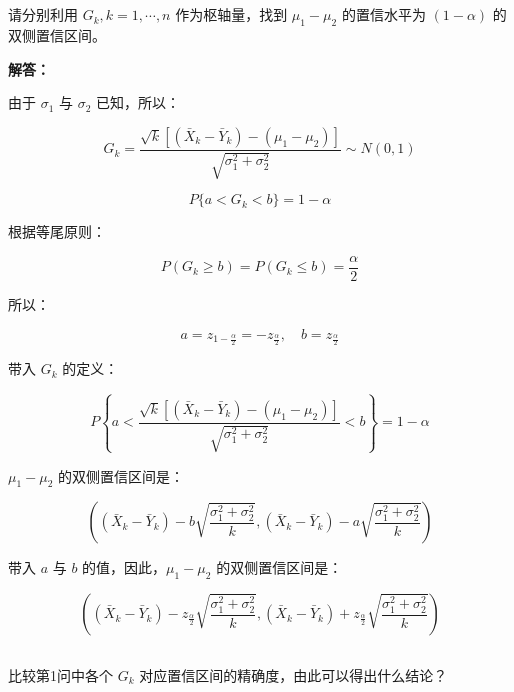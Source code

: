 \documentclass[12pt,a4paper]{article}
\begin{document}
\subsection{}

请分别利用 $G_k, k=1,\cdots,n$ 作为枢轴量，找到 $\mu_1-\mu_2$ 的置信水平为 $(1-\alpha)$ 的双侧置信区间。

\begin{answerbox}
\textbf{解答：}
  
由于 $\sigma_1$ 与 $\sigma_2$ 已知，所以：

$$
G_k = \frac{\sqrt{k}\left[(\bar{X}_k-\bar{Y}_k)-(\mu_1-\mu_2)\right]}{\sqrt{\sigma_1^2+\sigma_2^2}} \sim N(0,1)
$$

$$
P\{a < G_k < b\} = 1 - \alpha
$$

根据等尾原则：

$$
P\left(G_k \geq b\right) = P\left(G_k \leq b\right) = \frac{\alpha}{2}
$$

所以：

$$
a = z_{1-\frac{\alpha}{2}} = -z_{\frac{\alpha}{2}}, \quad b = z_{\frac{\alpha}{2}}
$$

带入 $G_k$ 的定义：

$$
P\left\{a < \frac{\sqrt{k}\left[(\bar{X}_k-\bar{Y}_k)-(\mu_1-\mu_2)\right]}{\sqrt{\sigma_1^2+\sigma_2^2}} < b\right\}  = 1-\alpha
$$

$\mu_1-\mu_2$ 的双侧置信区间是：

$$
\left((\bar{X}_k-\bar{Y}_k)-b\sqrt{\frac{\sigma_1^2+\sigma_2^2}{k}}, (\bar{X}_k-\bar{Y}_k)-a\sqrt{\frac{\sigma_1^2+\sigma_2^2}{k}}\right)
$$

带入 $a$ 与 $b$ 的值，因此，$\mu_1-\mu_2$ 的双侧置信区间是：

$$
\left((\bar{X}_k-\bar{Y}_k)-z_{\frac{\alpha}{2}}\sqrt{\frac{\sigma_1^2+\sigma_2^2}{k}}, (\bar{X}_k-\bar{Y}_k)+z_{\frac{\alpha}{2}}\sqrt{\frac{\sigma_1^2+\sigma_2^2}{k}}\right)
$$
\end{answerbox}


\subsection{}

比较第1问中各个 $G_k$ 对应置信区间的精确度，由此可以得出什么结论？
\end{document}
